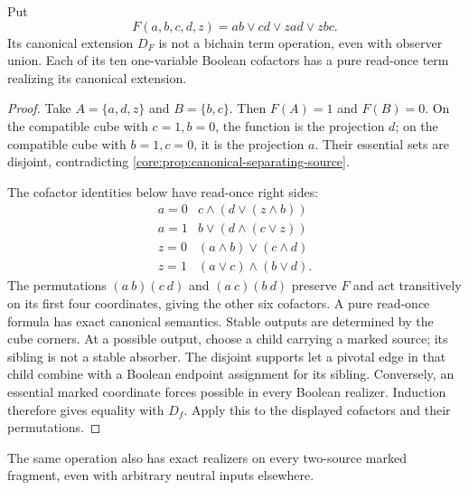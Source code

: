\begin{theorem}
\label{core:thm:canonical-cofactor-obstruction}
Put
\[
 F(a,b,c,d,z)=ab\lor cd\lor zad\lor zbc.
\]
Its canonical extension $D_F$ is not a bichain term operation, even
with observer union. Each of its ten one-variable Boolean cofactors
has a pure read-once term realizing its canonical extension.
\end{theorem}
\begin{proof}
Take $A=\{a,d,z\}$ and $B=\{b,c\}$. Then $F(A)=1$ and $F(B)=0$.
On the compatible cube with $c=1,b=0$, the function is the projection
$d$; on the compatible cube with $b=1,c=0$, it is the projection $a$.
Their essential sets are disjoint, contradicting
\cref{core:prop:canonical-separating-source}.

The cofactor identities below have read-once right sides:
\[
\begin{array}{c|c}
 a=0&c\wedge(d\vee(z\wedge b))\\
 a=1&b\vee(d\wedge(c\vee z))\\
 z=0&(a\wedge b)\vee(c\wedge d)\\
 z=1&(a\vee c)\wedge(b\vee d).
\end{array}
\]
The permutations $(a\ b)(c\ d)$ and $(a\ c)(b\ d)$ preserve $F$
and act transitively on its first four coordinates, giving the other
six cofactors. A pure read-once formula has exact canonical semantics.
Stable outputs are determined by the cube corners. At a possible output,
choose a child carrying a marked source; its sibling is not a stable
absorber. The disjoint supports let a pivotal edge in that child combine
with a Boolean endpoint assignment for its sibling. Conversely, an
essential marked coordinate forces possible in every Boolean realizer.
Induction therefore gives equality with $D_f$. Apply this to the
displayed cofactors and their permutations.
\end{proof}

The same operation also has exact realizers on every two-source marked
fragment, even with arbitrary neutral inputs elsewhere.

